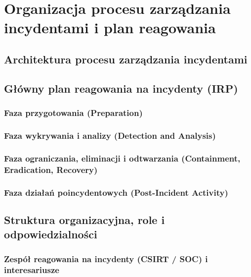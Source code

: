 \chapter{Organizacja procesu zarządzania incydentami i plan reagowania}\label{ch:organizacja-procesu}

\section{Architektura procesu zarządzania incydentami}\label{sec:architektura-procesu}

\section{Główny plan reagowania na incydenty (IRP)}\label{sec:plan-reagowania}

\subsection{Faza przygotowania (Preparation)}\label{subsec:faza-przygotowania}

\subsection{Faza wykrywania i analizy (Detection and Analysis)}\label{subsec:faza-wykrywania}

\subsection{Faza ograniczania, eliminacji i odtwarzania (Containment, Eradication, Recovery)}\label{subsec:faza-ograniczania}

\subsection{Faza działań poincydentowych (Post-Incident Activity)}\label{subsec:faza-poincydentowa}

\section{Struktura organizacyjna, role i odpowiedzialności}\label{sec:role-odpowiedzialnosci}

\subsection{Zespół reagowania na incydenty (CSIRT / SOC) i interesariusze}\label{subsec:zespol-csirt}

